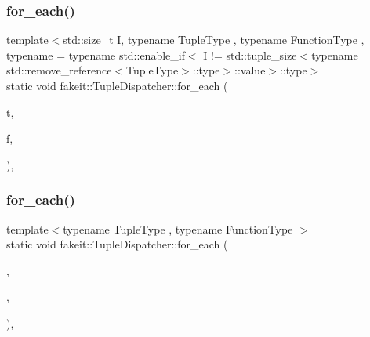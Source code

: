 \mbox{\label{structfakeit_1_1TupleDispatcher_afd32e025fbf695e16bb4b4ac1642c491}} 
\subsubsection{\texorpdfstring{for\_each()}{for\_each()}\hspace{0.1cm}{\footnotesize\ttfamily [8/54]}}
{\footnotesize\ttfamily template$<$std\+::size\+\_\+t I, typename Tuple\+Type , typename Function\+Type , typename  = typename std\+::enable\+\_\+if$<$            I != std\+::tuple\+\_\+size$<$typename std\+::remove\+\_\+reference$<$\+Tuple\+Type$>$\+::type$>$\+::value$>$\+::type$>$ \\
static void fakeit\+::\+Tuple\+Dispatcher\+::for\+\_\+each (\begin{DoxyParamCaption}\item[{Tuple\+Type \&\&}]{t,  }\item[{Function\+Type \&}]{f,  }\item[{std\+::integral\+\_\+constant$<$ size\+\_\+t, I $>$}]{ }\end{DoxyParamCaption})\hspace{0.3cm}{\ttfamily [inline]}, {\ttfamily [static]}}

\mbox{\label{structfakeit_1_1TupleDispatcher_af22c1fae8c695f722da986df9af411ca}} 
\subsubsection{\texorpdfstring{for\_each()}{for\_each()}\hspace{0.1cm}{\footnotesize\ttfamily [9/54]}}
{\footnotesize\ttfamily template$<$typename Tuple\+Type , typename Function\+Type $>$ \\
static void fakeit\+::\+Tuple\+Dispatcher\+::for\+\_\+each (\begin{DoxyParamCaption}\item[{Tuple\+Type \&\&}]{,  }\item[{Function\+Type \&}]{,  }\item[{std\+::integral\+\_\+constant$<$ size\+\_\+t, std\+::tuple\+\_\+size$<$ typename std\+::remove\+\_\+reference$<$ Tuple\+Type $>$\+::type $>$\+::value $>$}]{ }\end{DoxyParamCaption})\hspace{0.3cm}{\ttfamily [inline]}, {\ttfamily [static]}}

